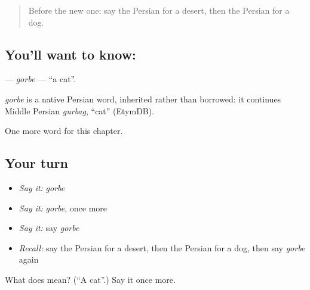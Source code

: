 \label{lesson:FA-C54-gorbe}



\begin{quote}
Before the new one: say the Persian for a desert, then the Persian for a dog.
\end{quote}

\subsection*{You'll want to know: }
\textbf{} — \emph{gorbe} — \textquotedblleft{}a cat\textquotedblright{}.

\begin{cousinweb}
\emph{gorbe} is a native Persian word, inherited rather than borrowed: it continues Middle Persian \emph{gurbag}, \textquotedblleft{}cat\textquotedblright{} (EtymDB).
\end{cousinweb}

\begin{grammarlens}[title={What you've built}]
One more word for this chapter.
\end{grammarlens}

\subsection*{Your turn}
\begin{itemize}
\raggedright
  \item \emph{Say it:} \emph{gorbe}
  \item \emph{Say it:} \emph{gorbe}, once more
  \item \emph{Say it:} say \emph{gorbe}
  \item \emph{Recall:} say the Persian for a desert, then the Persian for a dog, then say \emph{gorbe} again
\end{itemize}

\begin{tcolorbox}[breakable,colback=teal!4,colframe=teal!35!black,title={Before you move on}]
What does  mean? (\textquotedblleft{}A cat\textquotedblright{}.) Say it once more.
\end{tcolorbox}
